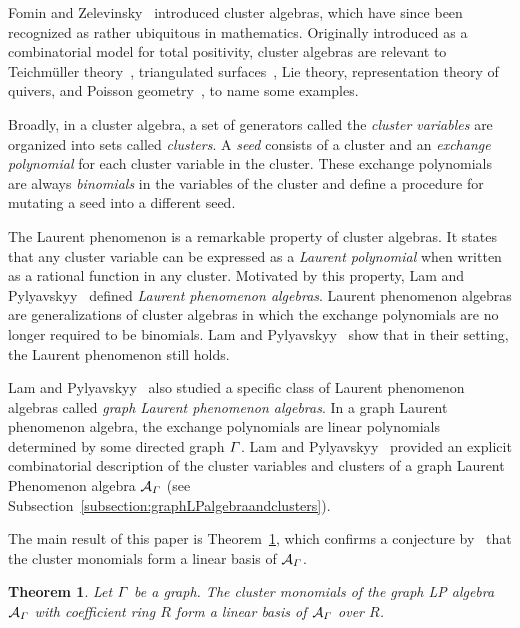 \documentclass[11pt]{article}
\newtheorem{theo}{Theorem}[section]
\theoremstyle{definition}
\numberwithin{equation}{section}
\newcommand{\coefficientring}{R}
\newcommand{\graphLPalgebra}[1]{\mathcal{A}_{#1}}
\begin{document}
Fomin and Zelevinsky~\cite{clusteralgebrasi} introduced cluster algebras, which have since been recognized as rather ubiquitous in mathematics.
Originally introduced as a combinatorial model for total positivity, cluster algebras are relevant to Teichm\"{u}ller theory~\cite{cluster-teich}, triangulated surfaces~\cite{cluster-triangulated-surface}, Lie theory, representation theory of quivers, and Poisson geometry~\cite{cluster-poisson}, to name some examples.

Broadly, in a cluster algebra, a set of generators called the \textit{cluster variables} are organized into sets called \textit{clusters}. A \textit{seed} consists of a cluster and an \textit{exchange polynomial} for each cluster variable in the cluster. These exchange polynomials are always \emph{binomials} in the variables of the cluster and define a procedure for mutating a seed into a different seed. 

The Laurent phenomenon is a remarkable property of cluster algebras. It states that any cluster variable can be expressed as a \textit{Laurent polynomial} when written as a rational function in any cluster. Motivated by this property, Lam and Pylyavskyy~\cite{LP} defined \emph{Laurent phenomenon algebras}. Laurent phenomenon algebras are generalizations of cluster algebras in which the exchange polynomials are no longer required to be binomials. Lam and Pylyavskyy~\cite{LP} show that in their setting, the Laurent phenomenon still holds. 

Lam and Pylyavskyy~\cite{linearLP} also studied a specific class of Laurent phenomenon algebras called \textit{graph Laurent phenomenon algebras}.
In a graph Laurent phenomenon algebra, the exchange polynomials are linear polynomials determined by some directed graph \(\varGamma\).
Lam and Pylyavskyy~\cite{linearLP} provided an explicit combinatorial description of the cluster variables and clusters of a graph Laurent Phenomenon algebra \(\graphLPalgebra{\graph}\) (see Subsection~\ref{subsection:graphLPalgebraandclusters}).

The main result of this paper is Theorem~\ref{theorem:fromlinearLP}, which confirms a conjecture by~\cite[Conjecture~7.3a]{linearLP} that the cluster monomials form a linear basis of \(\graphLPalgebra{\graph}\).

\begin{theo}\label{theorem:fromlinearLP}
    Let \(\varGamma\) be a graph.
    The cluster monomials of the graph LP algebra \(\graphLPalgebra{\graph}\) with coefficient ring \(\coefficientring\) form a linear basis of \(\graphLPalgebra{\graph}\) over \(\coefficientring\).
\end{theo}
\end{document}
